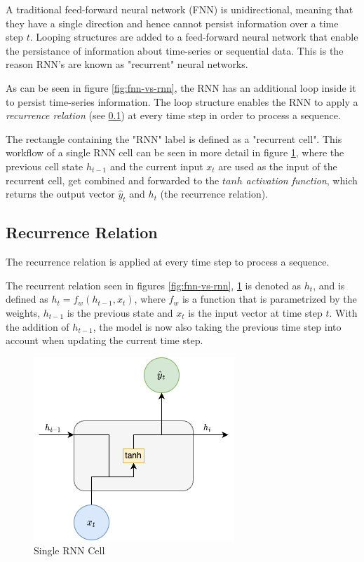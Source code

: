            A traditional feed-forward neural network (FNN) is unidirectional, meaning that they have a single direction and hence cannot persist information over a time step $t$.
            Looping structures are added to a feed-forward neural network that enable the persistance of information about time-series or sequential data. 
            This is the reason RNN's are known as "recurrent" neural networks.

            As can be seen in figure \ref{fig:fnn-vs-rnn}, the RNN has an additional loop inside it to persist time-series information. The loop structure enables the RNN to apply a \emph{recurrence relation} (see \ref{sec:recurrence-relation-background}) at every time step in order to process a sequence.

            The rectangle containing the "RNN" label is defined as a "recurrent cell".
            This workflow of a single RNN cell can be seen in more detail in figure \ref{fig:single-rnn-cell}, where the previous cell state $h_{t-1}$ and the current input $x_t$ are used as the input of the recurrent cell, get combined and forwarded to the $tanh$ \emph{activation function}, which returns the output vector $\hat{y}_t$ and $h_t$ (the recurrence relation).

        \subsection{Recurrence Relation}
        \label{sec:recurrence-relation-background}

            The recurrence relation is applied at every time step to process a sequence.

            The recurrent relation seen in figures \ref{fig:fnn-vs-rnn}, \ref{fig:single-rnn-cell} is denoted as $h_t$, and is defined as $h_t = f_w(h_{t - 1}, x_t)$, where $f_w$ is a function that is parametrized by the weights, $h_{t-1}$ is the previous state and $x_t$ is the input vector at time step $t$. With the addition of $h_{t-1}$, the model is now also taking the previous time step into account when updating the current time step. 
            \begin{figure}[h!]
                \centering
                \includegraphics[scale=0.5]{figures/single_rnn_cell.drawio.png}
                \caption{Single RNN Cell}
                \label{fig:single-rnn-cell}
            \end{figure}

